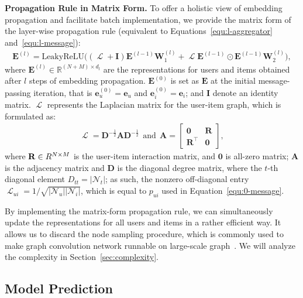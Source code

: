 \documentclass[sigconf]{acmart}
\newcommand{\Lapl}{\mathbf{\mathop{\mathcal{L}}}}
\newcommand{\Trans}[1]{{#1}^{\top}}
\newcommand{\Mat}[1]{\mathbf{#1}}
\newcommand{\Space}[1]{\mathbb{#1}}
\newcommand{\Set}[1]{\mathcal{#1}}
\newcommand{\BlockMatSquare}[4]{\left[\begin{matrix}#1 & #2\\#3 & #4\end{matrix}\right]}
\theoremstyle{definition}
\begin{document}
\vspace{5px}
\noindent\textbf{Propagation Rule in Matrix Form.}
To offer a holistic view of embedding propagation and facilitate batch implementation, we provide the matrix form of the layer-wise propagation rule (equivalent to Equations~\eqref{equ:l-aggregator} and~\eqref{equ:l-message}):
\begin{align}\label{equ:rule}
\Mat{E}^{(l)}=\text{LeakyReLU}\Big((\Lapl+\Mat{I})\Mat{E}^{(l-1)}\Mat{W}^{(l)}_{1} + \Lapl\Mat{E}^{(l-1)}\odot\Mat{E}^{(l-1)}\Mat{W}^{(l)}_{2}\Big),
\end{align}
where $\Mat{E}^{(l)}\in\Space{R}^{(N+M)\times d_{l}}$ are the representations for users and items obtained after $l$ steps of embedding propagation.
$\Mat{E}^{(0)}$ is set as $\Mat{E}$ at the initial message-passing iteration, that is $\Mat{e}^{(0)}_{u}=\Mat{e}_{u}$ and $\Mat{e}^{(0)}_{i}=\Mat{e}_{i}$;
and $\Mat{I}$ denote an identity matrix.
$\Lapl$ represents the Laplacian matrix for the user-item graph, which is formulated as:
\begin{align}
\Lapl=\Mat{D}^{-\frac{1}{2}}\Mat{A}\Mat{D}^{-\frac{1}{2}}~~\text{and}~~\Mat{A}=\BlockMatSquare{\Mat{0}}{\Mat{R}}{\Trans{\Mat{R}}}{\Mat{0}},
\end{align}
where $\Mat{R}\in\space{R}^{N\times M}$ is the user-item interaction matrix, and $\Mat{0}$ is all-zero matrix;
$\Mat{A}$ is the adjacency matrix
and $\Mat{D}$ is the diagonal degree matrix, where the $t$-th diagonal element $D_{tt}=|\Set{N}_{t}|$;
as such, the nonzero off-diagonal entry $\Lapl_{ui}=1/\sqrt{|\Set{N}_{u}||\Set{N}_{i}|}$, which is equal to $p_{ui}$ used in Equation~\eqref{equ:0-message}.

By implementing the matrix-form propagation rule, we can simultaneously update the representations for all users and items in a rather efficient way. It allows us to discard the node sampling procedure, which is commonly used to make graph convolution network runnable on large-scale graph~\cite{DeepInf}.
We will analyze the complexity in Section~\ref{sec:complexity}.


\subsection{Model Prediction}
\end{document}
